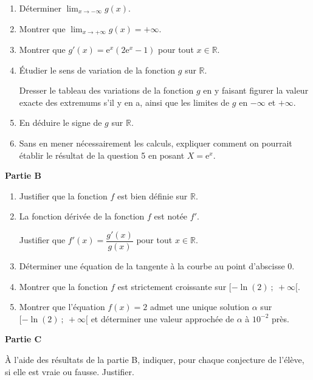 \documentclass[10pt]{article}
\providecommand{\R}{\mathbb{R}}
\providecommand{\e}{{\mathrm{e}}}
\begin{document}
\begin{enumerate}
\item Déterminer $\displaystyle\lim_{x \to - \infty} g(x)$.
\item Montrer que $\displaystyle\lim_{x \to + \infty} g(x) = + \infty$.
\item Montrer que $g'(x) = \e^x\left(2\e^x - 1\right)$ pour tout $x \in  \R$.
\item Étudier le sens de variation de la fonction $g$ sur $\R$.

Dresser le tableau des variations de la fonction $g$ en y faisant figurer la valeur exacte des extremums s'il y en a, ainsi que les limites de $g$ en $-\infty$ et $+ \infty$.
\item En déduire le signe de $g$ sur $\R$.
\item Sans en mener nécessairement les calculs, expliquer comment on pourrait établir le résultat
de la question 5 en posant $X = \e^x$.
\end{enumerate}

\medskip

\textbf{Partie B}

\medskip

\begin{enumerate}
\item Justifier que la fonction $f$ est bien définie sur $\R$.
\item La fonction dérivée de la fonction $f$ est notée $f'$.

Justifier que $f'(x) = \dfrac{g'(x)}{g(x)}$ pour tout $x \in \R$.
\item Déterminer une équation de la tangente à la courbe au point d'abscisse $0$.
\item Montrer que la fonction $f$ est strictement croissante sur $[-\ln (2)~;~ +\infty[$.
\item Montrer que l'équation $f(x) = 2$ admet une unique solution $\alpha$ sur $[-\ln (2)~;~ +\infty[$ et déterminer une valeur approchée de $\alpha$ à $10^{-2}$ près.
\end{enumerate}

\medskip

\textbf{Partie C}

\medskip

À l'aide des résultats de la partie B, indiquer, pour chaque conjecture de l'élève, si elle est vraie ou fausse. Justifier.

\medskip
\end{document}
